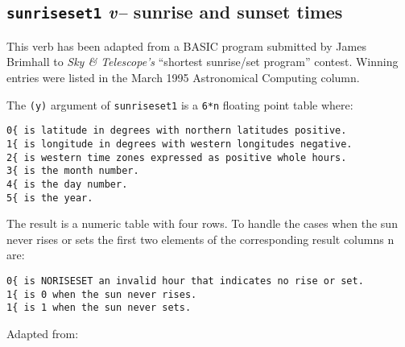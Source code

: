 \begin{Shaded}
\begin{Highlighting}[]
   \RegionMarkerTok{(} \RegionMarkerTok{)}  \KeywordTok{]}  

      
\end{Highlighting}
\end{Shaded}

\subsection{\textbf\texttt{sunriseset1} \textsl{v--} sunrise and sunset times}

This verb has been adapted from a BASIC program submitted by James
Brimhall to \emph{Sky \& Telescope's} ``shortest sunrise/set program''
contest. Winning entries were listed in the March 1995 Astronomical
Computing column.

The \texttt{(y)} argument of \texttt{sunriseset1} is a \texttt{6*n}
floating point table where:

\begin{verbatim}
0{ is latitude in degrees with northern latitudes positive.
1{ is longitude in degrees with western longitudes negative.
2{ is western time zones expressed as positive whole hours.
3{ is the month number.
4{ is the day number.
5{ is the year.
\end{verbatim}

The result is a numeric table with four rows. To handle the cases when
the sun never rises or sets the first two elements of the corresponding
result columns n are:

\begin{verbatim}
0{ is NORISESET an invalid hour that indicates no rise or set.
1{ is 0 when the sun never rises.
1{ is 1 when the sun never sets.
\end{verbatim}

Adapted from:

